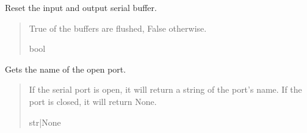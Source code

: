\documentclass[letterpaper,10pt,english]{sphinxmanual}
\begin{document}
\begin{fulllineitems}

\begin{fulllineitems}
\label{\detokenize{Morelia.Devices.SerialPorts:Morelia.Devices.SerialPorts.SerialComm.PortIO.Flush}}
\pysigstartsignatures
{}
\pysigstopsignatures
\sphinxAtStartPar
Reset the input and output serial buffer.
\begin{quote}\begin{description}
\sphinxAtStartPar
True of the buffers are flushed, False otherwise.

\sphinxAtStartPar
bool

\end{description}\end{quote}

\end{fulllineitems}


\begin{fulllineitems}
\label{\detokenize{Morelia.Devices.SerialPorts:Morelia.Devices.SerialPorts.SerialComm.PortIO.GetPortName}}
\pysigstartsignatures
{}
\pysigstopsignatures
\sphinxAtStartPar
Gets the name of the open port.
\begin{quote}\begin{description}
\sphinxAtStartPar
If the serial port is open, it will return a string of the port’s name.                 If the port is closed, it will return None.

\sphinxAtStartPar
str|None

\end{description}\end{quote}

\end{fulllineitems}



\end{fulllineitems}
\end{document}
